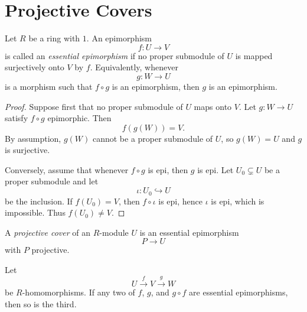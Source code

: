 \section{Projective Covers}

\begin{definition}
    Let $R$ be a ring with $1$. An epimorphism
    \[
        f:U\to V
    \]
    is called an \emph{essential epimorphism} if no proper submodule of $U$ is mapped
    surjectively onto $V$ by $f$. Equivalently, whenever
    \[
        g:W\to U
    \]
    is a morphism such that $f\circ g$ is an epimorphism, then $g$ is an epimorphism.
\end{definition}

\begin{proof}
    Suppose first that no proper submodule of $U$ maps onto $V$. Let $g:W\to U$ satisfy $f\circ g$ epimorphic. Then
    \[
        f(g(W))=V.
    \]
    By assumption, $g(W)$ cannot be a proper submodule of $U$, so $g(W)=U$ and $g$ is
    surjective.

    Conversely, assume that whenever $f\circ g$ is epi, then $g$ is epi. Let $U_0\subsetneq U$ be a proper submodule and let
    \[
        \iota:U_0\hookrightarrow U
    \]
    be the inclusion. If $f(U_0)=V$, then $f\circ \iota$ is epi, hence $\iota$ is epi, which is
    impossible. Thus $f(U_0)\neq V$.
\end{proof}

\begin{definition}
    A \emph{projective cover} of an $R$-module $U$ is an essential epimorphism
    \[
        P\to U
    \]
    with $P$ projective.
\end{definition}

\begin{proposition}
    Let
    \[
        U\xrightarrow{\,f\,} V\xrightarrow{\,g\,} W
    \]
    be $R$-homomorphisms. If any two of $f$, $g$, and $g\circ f$ are essential epimorphisms,
    then so is the third.
\end{proposition}

